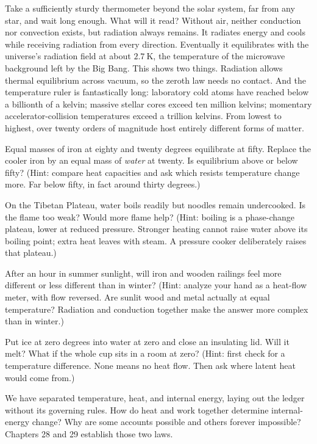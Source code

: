 
\begin{thought}
Take a sufficiently sturdy thermometer beyond the solar system, far from any star, and wait long enough. What will it read? Without air, neither conduction nor convection exists, but radiation always remains. It radiates energy and cools while receiving radiation from every direction. Eventually it equilibrates with the universe's radiation field at about \(2.7\ \mathrm{K}\), the temperature of the microwave background left by the Big Bang. This shows two things. Radiation allows thermal equilibrium across vacuum, so the zeroth law needs no contact. And the temperature ruler is fantastically long: laboratory cold atoms have reached below a billionth of a kelvin; massive stellar cores exceed ten million kelvins; momentary accelerator-collision temperatures exceed a trillion kelvins. From lowest to highest, over twenty orders of magnitude host entirely different forms of matter.
\end{thought}

\begin{puzzles}
\item Equal masses of iron at eighty and twenty degrees equilibrate at fifty. Replace the cooler iron by an equal mass of \emph{water} at twenty. Is equilibrium above or below fifty? (Hint: compare heat capacities and ask which resists temperature change more. Far below fifty, in fact around thirty degrees.)
\item On the Tibetan Plateau, water boils readily but noodles remain undercooked. Is the flame too weak? Would more flame help? (Hint: boiling is a phase-change plateau, lower at reduced pressure. Stronger heating cannot raise water above its boiling point; extra heat leaves with steam. A pressure cooker deliberately raises that plateau.)
\item After an hour in summer sunlight, will iron and wooden railings feel more different or less different than in winter? (Hint: analyze your hand as a heat-flow meter, with flow reversed. Are sunlit wood and metal actually at equal temperature? Radiation and conduction together make the answer more complex than in winter.)
\item Put ice at zero degrees into water at zero and close an insulating lid. Will it melt? What if the whole cup sits in a room at zero? (Hint: first check for a temperature difference. None means no heat flow. Then ask where latent heat would come from.)
\end{puzzles}

We have separated temperature, heat, and internal energy, laying out the ledger without its governing rules. How do heat and work together determine internal-energy change? Why are some accounts possible and others forever impossible? Chapters 28 and 29 establish those two laws.
